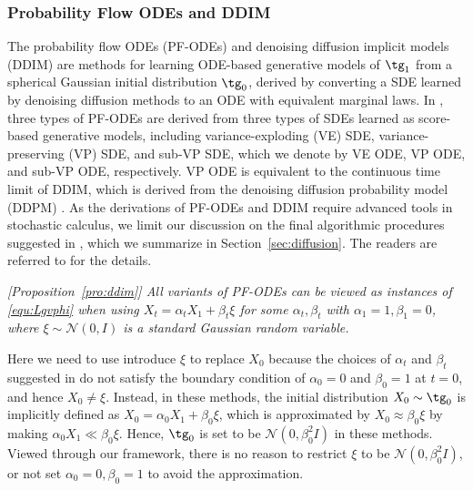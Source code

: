\documentclass[11pt]{article}
\newcommand{\normal}{\mathcal{N}}
\begin{document}
\subsubsection{Probability Flow ODEs and DDIM} 
The probability flow ODEs (PF-ODEs) \cite{song2020score}  and denoising diffusion implicit models (DDIM)  \cite{song2020denoising} 
are methods for learning  ODE-based generative models of $\tg_1$ from a spherical Gaussian initial distribution $\tg_0$, derived by converting a SDE learned by  
denoising diffusion methods to an ODE 
with equivalent marginal laws. 
In \cite{song2020score}, 
three types of PF-ODEs are derived from 
three types of SDEs learned as score-based generative models,  including 
variance-exploding (VE) SDE,
variance-preserving (VP) SDE,
and sub-VP SDE, 
which we denote by 
VE ODE, VP ODE, and sub-VP ODE, respectively. 
VP ODE is equivalent to the continuous time limit of DDIM, 
which is derived from the denoising diffusion probability model (DDPM) \cite{ho2020denoising}. 
As the derivations of PF-ODEs and DDIM 
require advanced tools in stochastic calculus, 
we limit our discussion on the final algorithmic  procedures suggested in \cite{song2020score, ho2020denoising}, which we summarize in Section~\ref{sec:diffusion}.  
The readers are referred to \cite{song2020score, song2020denoising} for the details. 



\emph{[Proposition~\ref{pro:ddim}] 
All variants of PF-ODEs 
can be 
viewed as instances of \eqref{equ:Lgvphi}  
when using 
$X_t = \alpha_t X_1 +
\beta_t \xi$ for some $\alpha_t,\beta_t$ with $\alpha_1=1,\beta_1=0$, where 
$\xi \sim \normal(0, I)$ is a standard Gaussian random variable. 
}

Here we need to use introduce $\xi$ to replace $X_0$ because the choices of $\alpha_t$ and $\beta_t$  suggested in \cite{song2020score, song2020denoising, ho2020denoising} 
do not satisfy the boundary condition of $\alpha_0 = 0$ and $\beta_0 = 1$ at $t=0$, and hence $X_0 \neq \xi$. 
Instead,  
in these methods, the initial distribution $X_0\sim \tg_0$ is implicitly defined as $X_0 = \alpha_0  X_1 + \beta_0 \xi$, 
which is approximated by $X_0 \approx \beta_0 \xi $ by making $\alpha_0 X_1 \ll \beta_0 \xi$.   
Hence, $\tg_0$ is set to be  $\normal(0, \beta_0^2 I)$ in these methods. 
Viewed through our framework, 
there is no reason to restrict $\xi$ to be $\normal(0, \beta_0^2 I)$,  %
or not set $\alpha_0=0,\beta_0=1$ to avoid the approximation. 
\end{document}
